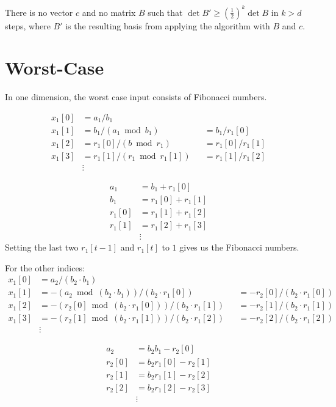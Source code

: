 \documentclass[english,version-2020-11]{uzl-thesis}
\begin{document}
\begin{lemma}
  There is no vector $c$ and no matrix $B$
  such that $\det B' \ge \left(\frac12\right)^k \det B$ in $k > d$ steps,
  where $B'$ is the resulting basis from applying the algorithm with $B$ and $c$.
\end{lemma}

\section{Worst-Case}

In one dimension, the worst case input consists of Fibonacci numbers.

\[\begin{aligned}
  x_1[0] & = a_1/b_1                       \\
  x_1[1] & = b_1/(a_1 \bmod b_1)              && = b_1 / r_1[0]      \\
  x_1[2] & = r_1[0]/(b \bmod r_1)       && = r_1[0] / r_1[1] \\
  x_1[3] & = r_1[1]/(r_1 \bmod r_1[1])  && = r_1[1] / r_1[2] \\
         & \vdots
\end{aligned}\]

\begin{align*}
  a_1    & = b_1 + r_1[0]      \\
  b_1    & = r_1[0]+ r_1[1]  \\
  r_1[0] & = r_1[1] + r_1[2] \\
  r_1[1] & = r_1[2] + r_1[3] \\
         & \vdots
\end{align*}
Setting the last two $r_1[t-1]$ and $r_1[t]$ to $1$ gives us the Fibonacci numbers.

For the other indices:
\[\begin{aligned}
  x_1[0] & = a_2/(b_2 \cdot b_1)                                    \\
  x_1[1] & = -(a_2 \bmod (b_2 \cdot b_1)) / (b_2 \cdot r_1[0])        &  & = -r_2[0] / (b_2 \cdot r_1[0]) \\
  x_1[2] & = -(r_2[0] \bmod (b_2 \cdot r_1[0])) / (b_2 \cdot r_1[1])  &  & = -r_2[1] / (b_2 \cdot r_1[1]) \\
  x_1[3] & = -(r_2[1] \bmod (b_2 \cdot r_1[1])) / (b_2 \cdot r_1[2])  &  & = -r_2[2] / (b_2 \cdot r_1[2]) \\
         & \vdots
\end{aligned}\]

\begin{align*}
  a_2    & = b_2 b_1 - r_2[0]      \\
  r_2[0] & = b_2 r_1[0] - r_2[1] \\
  r_2[1] & = b_2 r_1[1] - r_2[2] \\
  r_2[2] & = b_2 r_1[2] - r_2[3] \\
         & \vdots
\end{align*}
\end{document}
